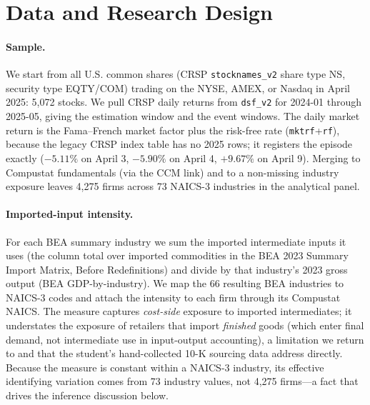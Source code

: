 \documentclass[12pt]{article}
\begin{document}
\section{Data and Research Design}\label{sec:data}
\paragraph{Sample.} We start from all U.S. common shares (CRSP \texttt{stocknames\_v2}
share type NS, security type EQTY/COM) trading on the NYSE, AMEX, or Nasdaq in April 2025:
5{,}072 stocks. We pull CRSP daily returns from \texttt{dsf\_v2} for 2024-01 through
2025-05, giving the estimation window and the event windows. The daily market return is the
Fama--French market factor plus the risk-free rate (\texttt{mktrf}+\texttt{rf}), because the
legacy CRSP index table has no 2025 rows; it registers the episode exactly ($-5.11\%$ on
April 3, $-5.90\%$ on April 4, $+9.67\%$ on April 9). Merging to Compustat fundamentals
(via the CCM link) and to a non-missing industry exposure leaves 4{,}275 firms across 73
NAICS-3 industries in the analytical panel.

\paragraph{Imported-input intensity.} For each BEA summary industry we sum the imported
intermediate inputs it uses (the column total over imported commodities in the BEA 2023
Summary Import Matrix, Before Redefinitions) and divide by that industry's 2023 gross output
(BEA GDP-by-industry). We map the 66 resulting BEA industries to NAICS-3 codes and attach
the intensity to each firm through its Compustat NAICS. The measure captures \emph{cost-side}
exposure to imported intermediates; it understates the exposure of retailers that import
\emph{finished} goods (which enter final demand, not intermediate use in input-output
accounting), a limitation we return to and that the student's hand-collected 10-K sourcing
data address directly. Because the measure is constant within a NAICS-3 industry, its
effective identifying variation comes from 73 industry values, not 4{,}275 firms---a fact that
drives the inference discussion below.
\end{document}
